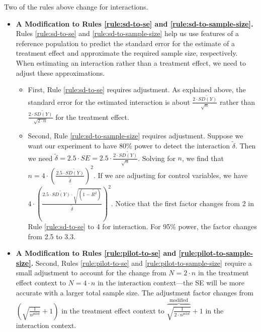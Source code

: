 \documentclass[12pt]{article}
\begin{document}
Two of the rules above change for interactions.

\begin{itemize}
\item 
  \textbf{A Modification to Rules \ref{rule:sd-to-se} and \ref{rule:sd-to-sample-size}.} 
  Rules \ref{rule:sd-to-se} and \ref{rule:sd-to-sample-size} help us use features of a reference population to predict the standard error for the estimate of a treatment effect and approximate the required sample size, respectively. 
  When estimating an interaction rather than a treatment effect, we need to adjust these approximations. 
  \begin{itemize}
      \item   First, Rule \ref{rule:sd-to-se} requires adjustment. As explained above, the standard error for the estimated interaction is about $\frac{2 \cdot \widetilde{SD(Y)}}{\sqrt{n}}$ rather than $\frac{2 \cdot \widetilde{SD(Y)}}{\sqrt{2 \cdot n}}$ for the treatment effect.
      \item Second, Rule \ref{rule:sd-to-sample-size} requires adjustment. 
      Suppose we want our experiment to have 80\% power to detect the interaction $\widetilde{\delta}$. 
      Then we need $\widetilde{\delta} = 2.5 \cdot SE = 2.5 \cdot \frac{2 \cdot \widetilde{SD(Y)}}{\sqrt{n}}$. 
      Solving for $n$, we find that $n = 4 \cdot \left( \frac{2.5 \cdot \widetilde{SD(Y)}}{\widetilde{\delta}} \right)^{2}$. 
      If we are adjusting for control variables, we have $4 \cdot \left( \frac{\dot{2.5 \cdot \widetilde{SD(Y)} \cdot \sqrt{\left( 1 - \widetilde{R^{2}} \right)}}}{\widetilde{\delta}} \right)^{2}$. 
      Notice that the first factor changes from 2 in Rule \ref{rule:sd-to-se} to 4 for interaction. 
      For 95\% power, the factor changes from 2.5 to 3.3.
  \end{itemize}
\item \textbf{A Modification to Rules \ref{rule:pilot-to-se} and \ref{rule:pilot-to-sample-size}.} Second, Rules \ref{rule:pilot-to-se} and \ref{rule:pilot-to-sample-size} require a small adjustment to account for the change from $N = 2 \cdot n$ in the treatment effect context to $N = 4 \cdot n$ in the interaction context---the SE will be more accurate with a larger total sample size. 
The adjustment factor changes from $\left( \sqrt{\frac{1}{n^{pilot}}} + 1 \right)$ in the treatment effect context to $\overset{\text{modified}}{\overbrace{\sqrt{\frac{1}{2 \cdot n^{pilot}}}}} + 1$ in the interaction context.
\end{itemize}
\end{document}

